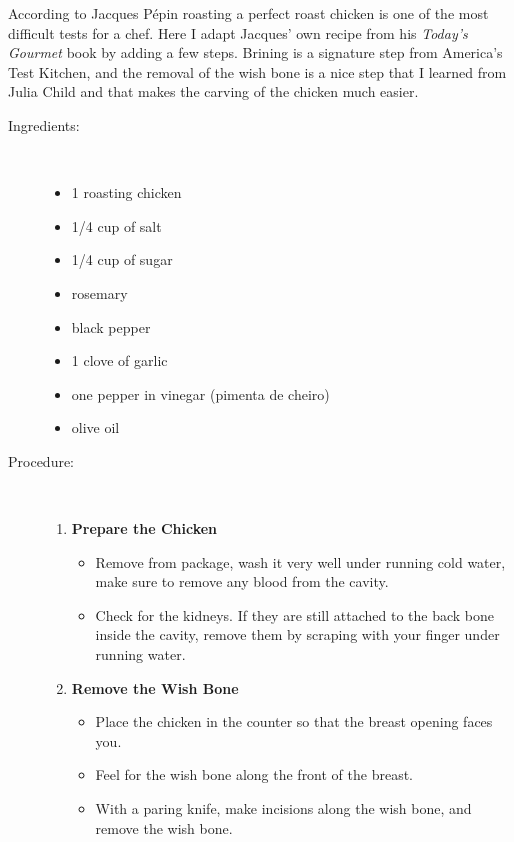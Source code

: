 \documentclass[11pt,letterpaper]{article}
\begin{document}


According to Jacques P\'epin roasting a perfect roast chicken is one of the most difficult tests for a chef. Here I adapt Jacques' own recipe from his {\it Today's Gourmet} book by adding a few steps. Brining is a signature step from America's Test Kitchen, and the removal of the wish bone is a nice step that I learned from Julia Child and that makes the carving of the chicken much easier.
 
\begin {description}

\item[Ingredients:]\ \\
\begin{itemize}
	\item 1 roasting chicken
	\item 1/4 cup of salt
	\item 1/4 cup of sugar
	\item rosemary
	\item black pepper
	\item 1 clove of garlic
	\item one pepper in vinegar (pimenta de cheiro)
	\item olive oil
\end{itemize}

\item[Procedure:]\ \\

\begin{enumerate}
\item {\bf Prepare the Chicken}
\begin{itemize}
\item Remove from package, wash it very well under running cold water, make sure to remove any blood from the cavity. 
\item Check for the kidneys. If they are still attached to the back bone inside the cavity, remove them by scraping with your finger under running water.
\end{itemize}

\item {\bf Remove the Wish Bone}
\begin{itemize}
\item Place the chicken in the counter so that the breast opening faces you. 
\item Feel for the wish bone along the front of the breast. 
\item With a paring knife, make incisions along the wish bone, and remove the wish bone. 
\end{itemize}


\end{enumerate}
\end{description}
\end{document}
